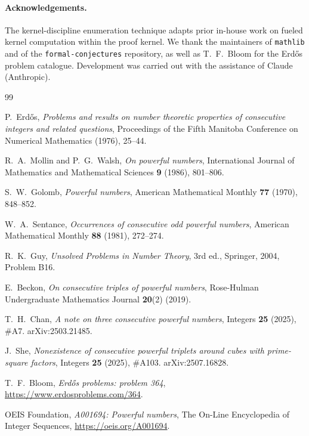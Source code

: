 \documentclass[11pt]{article}
\theoremstyle{definition}
\theoremstyle{remark}
\newcommand{\code}[1]{\texttt{#1}}
\begin{document}
\paragraph{Acknowledgements.}
The kernel-discipline enumeration technique adapts prior in-house
work on fueled kernel computation within the proof kernel. We thank the maintainers of \code{mathlib}
and of the \code{formal-conjectures} repository, as well as
T.~F.~Bloom for the Erd\H{o}s problem catalogue. Development was carried
out with the assistance of Claude (Anthropic).

\begin{thebibliography}{99}\small

P.~Erd\H{o}s,
\emph{Problems and results on number theoretic properties of consecutive
integers and related questions},
Proceedings of the Fifth Manitoba Conference on Numerical Mathematics
(1976), 25--44.

R.~A.~Mollin and P.~G.~Walsh,
\emph{On powerful numbers},
International Journal of Mathematics and Mathematical Sciences
\textbf{9} (1986), 801--806.

S.~W.~Golomb,
\emph{Powerful numbers},
American Mathematical Monthly \textbf{77} (1970), 848--852.

W.~A.~Sentance,
\emph{Occurrences of consecutive odd powerful numbers},
American Mathematical Monthly \textbf{88} (1981), 272--274.

R.~K.~Guy,
\emph{Unsolved Problems in Number Theory},
3rd ed., Springer, 2004, Problem B16.

E.~Beckon,
\emph{On consecutive triples of powerful numbers},
Rose-Hulman Undergraduate Mathematics Journal \textbf{20}(2) (2019).

T.~H.~Chan,
\emph{A note on three consecutive powerful numbers},
Integers \textbf{25} (2025), \#A7. arXiv:2503.21485.

J.~She,
\emph{Nonexistence of consecutive powerful triplets around cubes with
prime-square factors},
Integers \textbf{25} (2025), \#A103. arXiv:2507.16828.

T.~F.~Bloom,
\emph{Erd\H{o}s problems: problem 364},
\url{https://www.erdosproblems.com/364}.

OEIS Foundation,
\emph{A001694: Powerful numbers},
The On-Line Encyclopedia of Integer Sequences,
\url{https://oeis.org/A001694}.


\end{thebibliography}
\end{document}
